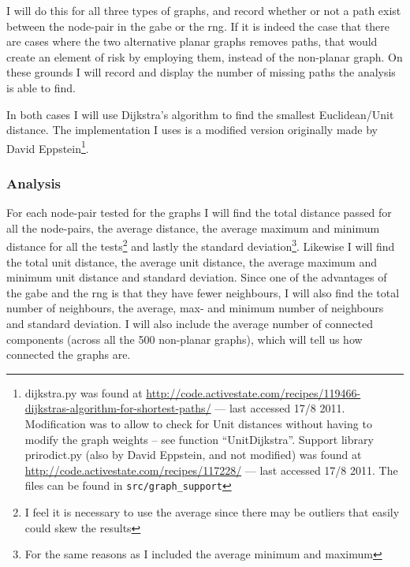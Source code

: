 I will do this for all three types of graphs, and record whether or not a path exist between the node-pair in the \ac{gabe} or the \ac{rng}. If it is indeed the case that there are cases where the two alternative planar graphs removes paths, that would create an element of risk by employing them, instead of the non-planar graph. On these grounds I will record and display the number of missing paths the analysis is able to find.

In both cases I will use Dijkstra's algorithm to find the smallest Euclidean/Unit distance. The implementation I uses is a modified version originally made by David Eppstein\footnote{dijkstra.py was found at \url{http://code.activestate.com/recipes/119466-dijkstras-algorithm-for-shortest-paths/} --- last accessed 17/8 2011. Modification was to allow to check for Unit distances without having to modify the graph weights -- see function ``UnitDijkstra''. Support library prirodict.py (also by David Eppstein, and not modified) was found at \url{http://code.activestate.com/recipes/117228/} --- last accessed 17/8 2011. The files can be found in \texttt{src/graph\_support}}.

\subsubsection{Analysis}
For each node-pair tested for the graphs I will find the total distance passed for all the node-pairs, the average distance, the average maximum and minimum distance for all the tests\footnote{I feel it is necessary to use the average since there may be outliers that easily could skew the results} and lastly the standard deviation\footnote{For the same reasons as I included the average minimum and maximum}. Likewise I will find the total unit distance, the average unit distance, the average maximum and minimum unit distance and standard deviation. Since one of the advantages of the \ac{gabe} and the \ac{rng} is that they have fewer neighbours, I will also find the total number of neighbours, the average, max- and minimum number of neighbours and standard deviation. I will also include the average number of connected components (across all the 500 non-planar graphs), which will tell us how connected the graphs are.

